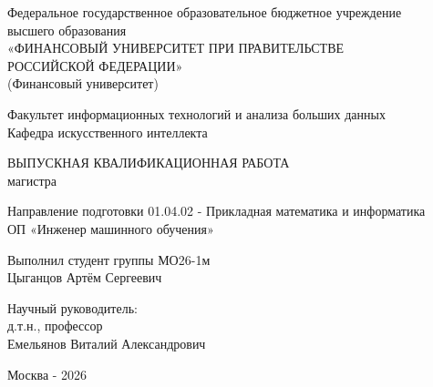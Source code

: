 \begin{titlepage}
\thispagestyle{empty}
\setlength{\parindent}{0pt}
\small
\begin{center}
Федеральное государственное образовательное бюджетное учреждение\\
высшего образования\\
«ФИНАНСОВЫЙ УНИВЕРСИТЕТ ПРИ ПРАВИТЕЛЬСТВЕ\\
РОССИЙСКОЙ ФЕДЕРАЦИИ»\\
(Финансовый университет)
\end{center}

\vspace{0.8em}
\begin{center}
\normalsize
Факультет информационных технологий и анализа больших данных\\
Кафедра искусственного интеллекта
\end{center}

\vspace{2.5em}
\begin{center}
\normalsize
ВЫПУСКНАЯ КВАЛИФИКАЦИОННАЯ РАБОТА\\
магистра
\end{center}

\vspace{2em}
\begin{center}
\normalsize
Направление подготовки 01.04.02 - Прикладная математика и информатика\\[0.6em]
ОП «Инженер машинного обучения»
\end{center}

\vfill
\begin{center}
\normalsize
\textbf{}
\end{center}
\vfill

\noindent
\begin{minipage}[t]{0.48\textwidth}
Выполнил студент группы МО26-1м\\
Цыганцов Артём Сергеевич
\end{minipage}
\hfill
\begin{minipage}[t]{0.48\textwidth}
\raggedleft
\small
Научный руководитель:\\
д.т.н., профессор\\
Емельянов Виталий Александрович
\end{minipage}

\vspace{3em}
\begin{center}
\normalsize
Москва - 2026
\end{center}
\end{titlepage}
